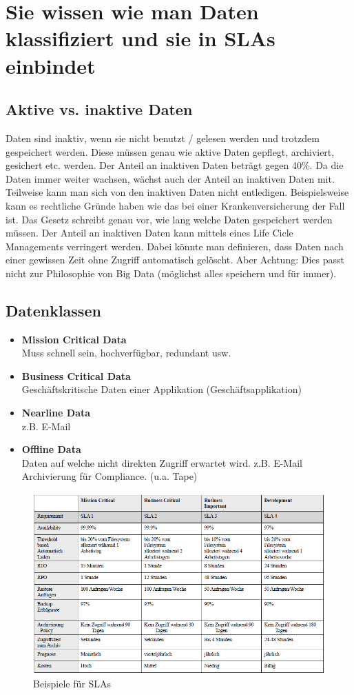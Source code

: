 \section{Sie wissen wie man Daten klassifiziert und sie in SLAs einbindet}
\subsection{Aktive vs. inaktive Daten}
Daten sind inaktiv, wenn sie nicht benutzt / gelesen werden und trotzdem gespeichert werden. Diese müssen genau wie aktive Daten gepflegt, archiviert, gesichert etc. werden.
Der Anteil an inaktiven Daten beträgt gegen 40\%. Da die Daten immer weiter wachsen, wächst auch der Anteil an inaktiven Daten mit. Teilweise kann man sich von den inaktiven Daten nicht entledigen. Beispielsweise kann es rechtliche Gründe haben wie das bei einer Krankenversicherung der Fall ist. Das Gesetz schreibt genau vor, wie lang welche Daten gespeichert werden müssen.
Der Anteil an inaktiven Daten kann mittels eines Life Cicle Managements verringert werden. Dabei könnte man definieren, dass Daten nach einer gewissen Zeit ohne Zugriff automatisch gelöscht. Aber Achtung: Dies passt nicht zur Philosophie von Big Data (möglichst alles speichern und für immer).

\subsection{Datenklassen}\label{sec:datenklassen}
\begin{itemize}
	\item \textbf{Mission Critical Data} \\
	Muss schnell sein, hochverfügbar, redundant usw.
	\item \textbf{Business Critical Data} \\
	Geschäftskritische Daten einer Applikation (Geschäftsapplikation)
	\item \textbf{Nearline Data} \\
	z.B. E-Mail
	\item \textbf{Offline Data} \\
	Daten auf welche nicht direkten Zugriff erwartet wird. z.B. E-Mail Archivierung für Compliance. (u.a. Tape)
\end{itemize}
\begin{figure}
	\centering
	\includegraphics[width=0.9\linewidth]{fig/sla}
	\caption{Beispiele für SLAs}
	\label{fig:sla_beispiele}
\end{figure}
